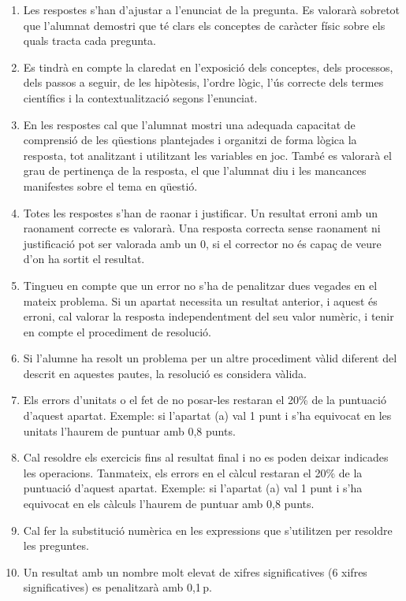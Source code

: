 \begin{enumerate}
  \item Les respostes s'han d'ajustar a l'enunciat de la pregunta. Es valorarà sobretot que l'alumnat demostri que té clars els conceptes de caràcter físic sobre els quals tracta cada pregunta.
  \item Es tindrà en compte la claredat en l'exposició dels conceptes, dels processos, dels passos a seguir, de les hipòtesis, l'ordre lògic, l'ús correcte dels termes científics i la contextualització segons l'enunciat.
  \item En les respostes cal que l'alumnat mostri una adequada capacitat de comprensió de les qüestions plantejades i organitzi de forma lògica la resposta, tot analitzant i utilitzant les variables en joc. També es valorarà el grau de pertinença de la resposta, el que l'alumnat diu i les mancances manifestes sobre el tema en qüestió.
  \item Totes les respostes s'han de raonar i justificar. Un resultat erroni amb un raonament correcte es valorarà. Una resposta correcta sense raonament ni justificació pot ser valorada amb un 0, si el corrector no és capaç de veure d'on ha sortit el resultat.
  \item Tingueu en compte que un error no s'ha de penalitzar dues vegades en el mateix problema. Si un apartat necessita un resultat anterior, i aquest és erroni, cal valorar la resposta independentment del seu valor numèric, i tenir en compte el procediment de resolució.
  \item Si l'alumne ha resolt un problema per un altre procediment vàlid diferent del descrit en aquestes pautes, la resolució es considera vàlida.
  \item Els errors d'unitats o el fet de no posar-les restaran el 20\% de la puntuació d'aquest apartat. Exemple: si l'apartat (a) val 1 punt i s'ha equivocat en les unitats l'haurem de puntuar amb 0,8 punts.
  \item Cal resoldre els exercicis fins al resultat final i no es poden deixar indicades les operacions. Tanmateix, els errors en el càlcul restaran el 20\% de la puntuació d'aquest apartat. Exemple: si l'apartat (a) val 1 punt i s'ha equivocat en els càlculs l'haurem de puntuar amb 0,8 punts.
  \item Cal fer la substitució numèrica en les expressions que s'utilitzen per resoldre les preguntes.
  \item Un resultat amb un nombre molt elevat de xifres significatives (6 xifres significatives) es penalitzarà amb 0,1\,p.
\end{enumerate}
